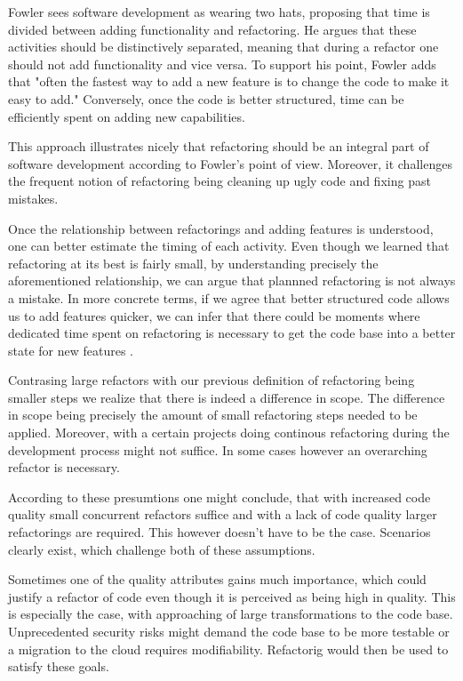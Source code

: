 Fowler sees software development as wearing two hats, 
	proposing that time is divided between adding functionality and refactoring. 
He argues that these activities should be distinctively separated, 
	meaning that during a refactor one should not add functionality and vice versa. 
To support his point, 
	Fowler adds that "often the fastest way to add a new feature is to change the code to make it easy to add." \cite[p.~53]{fowler2018} 
Conversely, once the code is better structured, 
	time can be efficiently spent on adding new capabilities.

This approach illustrates nicely that refactoring 
	should be an integral part of software development according to Fowler's point of view.  
Moreover, it challenges the frequent notion of refactoring being 
	cleaning up ugly code and fixing past mistakes. 

Once the relationship between refactorings and adding features is understood, 
	one can better estimate the timing of each activity.
Even though we learned that refactoring at its best is fairly small, 
	by understanding precisely the aforementioned relationship, 
	we can argue that plannned refactoring is not always a mistake.
In more concrete terms, if we agree that better structured code 
	allows us to add features quicker, 
	we can infer that there could be moments where dedicated time spent on refactoring 
	is necessary to get the code base into a better state for new features \cite[p.~53]{fowler2018}.

Contrasing large refactors with our previous definition of 
	refactoring being smaller steps we realize 
	that there is indeed a difference in scope.
The difference in scope being precisely 
	the amount of small refactoring steps needed to be applied. 
Moreover, with a certain projects doing continous refactoring during the development process might not suffice. 
In some cases however an overarching refactor is necessary.

According to these presumtions one might conclude, 
	that with increased code quality small concurrent refactors suffice 
	and with a lack of code quality larger refactorings are required. 
This however doesn't have to be the case. 
Scenarios clearly exist, which challenge both of these assumptions.

Sometimes one of the quality attributes gains much importance, 
	which could justify a refactor of code 
	even though it is perceived as being high in quality. 
This is especially the case,
	with approaching of large transformations to the code base. 
Unprecedented security risks might demand the code base 
	to be more testable or a migration to the cloud requires modifiability. Refactorig would then be used to satisfy these goals.

